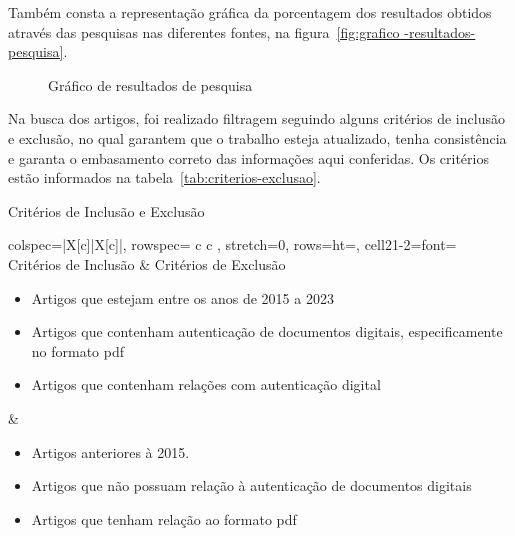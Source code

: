 Também consta a representação gráfica da porcentagem dos resultados obtidos
através das pesquisas nas diferentes fontes, na figura~\ref{fig:grafico
-resultados-pesquisa}.

\begin{figure}[h!]
    \caption[Gráfico de resultados da pesquisa]{Gráfico de resultados de
    pesquisa}
    \sourcesearchfootnote
    \label{fig:grafico-resultados-pesquisa}
\end{figure}

Na busca dos artigos, foi realizado filtragem seguindo alguns
critérios de inclusão e exclusão, no qual garantem que o trabalho
esteja atualizado, tenha consistência e garanta o embasamento
correto das informações aqui conferidas.
Os critérios estão informados na tabela~\ref{tab:criterios-exclusao}.

\begin{table}[h]
    \caption[Critérios de Inclusão e Exclusão]{Critérios de Inclusão e Exclusão}
    \begin{tblr}{
        colspec={|X[c]|X[c]|},
        rowspec={ c c },
        stretch=0,
        rows={ht=\baselineskip},
        cell{2}{1-2}={font=\small}
    }
        \hline
        Critérios de Inclusão & Critérios de Exclusão \\ \hline
        \begin{itemize}[leftmargin=10px]
            \item Artigos que estejam entre os anos de 2015 a 2023
            \item Artigos que contenham autenticação de documentos digitais,
            especificamente no formato \acrshort{pdf}
            \item Artigos que contenham relações com autenticação digital
        \end{itemize} &
        \begin{itemize}[leftmargin=10px]
            \item Artigos anteriores à 2015.
            \item Artigos que não possuam relação à autenticação de
            documentos digitais
            \item Artigos que tenham relação ao formato \acrshort{pdf}
        \end{itemize} \\ \hline
    \end{tblr}
    \sourcesearchfootnote
    \label{tab:criterios-exclusao}
\end{table}


